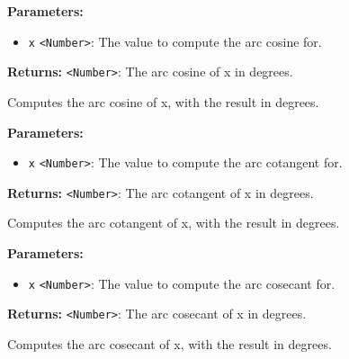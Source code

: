 \documentclass[12pt,a4paper]{article}
\begin{document}
\vspace{5mm}
\noindent {}


\noindent \textbf{Parameters:}
\begin{itemize}
  \item \texttt{x} \texttt{<Number>}: The value to compute the arc cosine for.
\end{itemize}

\noindent \textbf{Returns:} \texttt{<Number>}: The arc cosine of x in degrees.

\noindent Computes the arc cosine of x, with the result in degrees.

\vspace{5mm}
\noindent {}


\noindent \textbf{Parameters:}
\begin{itemize}
  \item \texttt{x} \texttt{<Number>}: The value to compute the arc cotangent for.
\end{itemize}

\noindent \textbf{Returns:} \texttt{<Number>}: The arc cotangent of x in degrees.

\noindent Computes the arc cotangent of x, with the result in degrees.

\vspace{5mm}
\noindent {}


\noindent \textbf{Parameters:}
\begin{itemize}
  \item \texttt{x} \texttt{<Number>}: The value to compute the arc cosecant for.
\end{itemize}

\noindent \textbf{Returns:} \texttt{<Number>}: The arc cosecant of x in degrees.

\noindent Computes the arc cosecant of x, with the result in degrees.

\vspace{5mm}
\noindent {}
\end{document}
